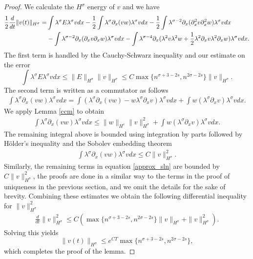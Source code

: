 \documentclass[reqno]{amsart}
\theoremstyle{plain}
\numberwithin{equation}{section}
\begin{document}
\begin{proof}
We calculate the $H^\sigma$ energy of $v$ and we have 
\begin{align}
\frac12 \frac{d}{dt} \| v(t) \| _{H^\sigma} = &  \int \lambda^\sigma E \lambda^\sigma v dx - \frac12 \int \lambda^\sigma \partial_x (vw)  \lambda^\sigma v dx 
 - \frac12   \int \lambda^{\sigma-2} \partial_x ( \partial_x^2 v\partial_x^2 w)  \lambda^\sigma v dx  
\label{approx_sln}
\\
& -   \int \lambda^{\sigma-2} \partial_x ( \partial_x v\partial_x w)  \lambda^\sigma v dx  
-   \int \lambda^{\sigma-4} \partial_x (  \lambda^2  v\lambda^2 w   + \frac12 \lambda^2  \partial_x v\lambda^2  \partial_xw)   \lambda^\sigma v dx  .
 \notag
\end{align}
The first term is handled by the Cauchy-Schwarz inequality and our estimate on the error
$$
 \int \lambda^\sigma E \lambda^\sigma v dx \le  \| E \|_{H^\sigma }  \| v\|_{H^\sigma } \le    C  \max\{ n^{\sigma+3-2s} , n^{2\sigma-2s}  \}  \| v\|_{H^\sigma } .
$$ 
The second term is written as a commutator as follows
\begin{align}
  \int \lambda^\sigma \partial_x (vw)  \lambda^\sigma v dx 
  =   \int  \left( \lambda^\sigma \partial_x (vw)  -  w  \lambda^\sigma \partial_x   v\right)  \lambda^\sigma v dx  + 
  \int  w  \left( \lambda^\sigma \partial_x   v \right)  \lambda^\sigma v dx  .
\end{align}
We apply Lemma \ref{ccm} to obtain 
\begin{align}
  \int \lambda^\sigma \partial_x (vw)  \lambda^\sigma v dx 
   \le \| w\|_{H^s} \| v\|_{H^\sigma} ^2+ 
  \int  w  \left( \lambda^\sigma \partial_x   v \right)  \lambda^\sigma v dx  .
\end{align}
The remaining integral above is bounded using integration by parts followed by H\"older's inequality and the Sobolev embedding theorem
\begin{align}
  \int \lambda^\sigma \partial_x (vw)  \lambda^\sigma v dx 
   \le C \| v\|_{H^\sigma} ^2    .
\end{align}
Similarly, the remaining terms in equation \eqref{approx_sln} are bounded by $C \|v\|_{H^\sigma}^2$, the proofs are done in a similar way to the terms in the proof of uniqueness in the previous section, and we omit the details for the sake of brevity. 
Combining these estimates we obtain the following differential inequality for $ \|v\|_{H^\sigma}^2$
\begin{align}
\frac{d}{dt }  \|v\|_{H^\sigma}^2 \le C\left( \max\{ n^{\sigma+3-2s} , n^{2\sigma-2s}  \}  \| v\|_{H^\sigma } +  \| v\|_{H^\sigma }  ^2\right) .
\end{align}
Solving this yields
$$
 \|v(t) \|_{H^\sigma} \le e^{CT}  \max\{ n^{\sigma+3-2s} , n^{2\sigma-2s} \},
$$
which completes the proof of the lemma. 
\end{proof}
\end{document}
